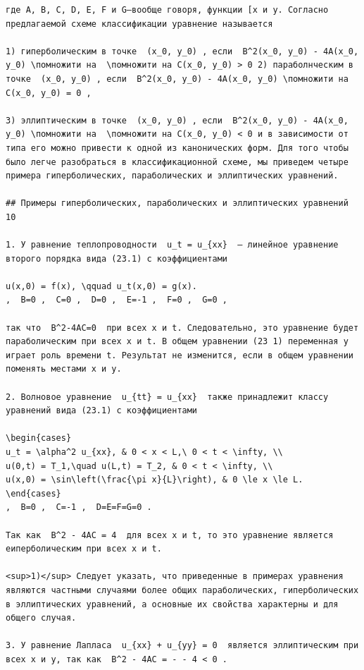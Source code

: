 \documentclass[
  ukrainian,
]{article}
\begin{document}
\begin{verbatim}
где A, B, C, D, E, F и G—вообще говоря, функции [x и y. Согласно предлагаемой схеме классификации уравнение называется

1) гиперболическим в точке  (x_0, y_0) , если  B^2(x_0, y_0) - 4A(x_0, y_0) \помножити на  \помножити на C(x_0, y_0) > 0 2) параболнческим в точке  (x_0, y_0) , если  B^2(x_0, y_0) - 4A(x_0, y_0) \помножити на C(x_0, y_0) = 0 ,

3) эллиптическим в точке  (x_0, y_0) , если  B^2(x_0, y_0) - 4A(x_0, y_0) \помножити на  \помножити на C(x_0, y_0) < 0 и в зависимости от типа его можно привести к одной из канонических форм. Для того чтобы было легче разобраться в классификационной схеме, мы приведем четыре примера гиперболических, параболических и эллиптических уравнений.

## Примеры гиперболических, параболических и эллиптических уравнений 10

1. У равнение теплопроводности  u_t = u_{xx}  — линейное уравнение второго порядка вида (23.1) с коэффициентами

u(x,0) = f(x), \qquad u_t(x,0) = g(x).
,  B=0 ,  C=0 ,  D=0 ,  E=-1 ,  F=0 ,  G=0 ,

так что  B^2-4AC=0  при всех x и t. Следовательно, это уравнение будет параболическим при всех x и t. В общем уравнении (23 1) переменная y играет роль времени t. Результат не изменится, если в общем уравнении поменять местами x и y.

2. Волновое уравнение  u_{tt} = u_{xx}  также принадлежит классу уравнений вида (23.1) с коэффициентами

\begin{cases}
u_t = \alpha^2 u_{xx}, & 0 < x < L,\ 0 < t < \infty, \\
u(0,t) = T_1,\quad u(L,t) = T_2, & 0 < t < \infty, \\
u(x,0) = \sin\left(\frac{\pi x}{L}\right), & 0 \le x \le L.
\end{cases}
,  B=0 ,  C=-1 ,  D=E=F=G=0 .

Так как  B^2 - 4AC = 4  для всех x и t, то это уравнение является еиперболическим при всех x и t.

<sup>1)</sup> Следует указать, что приведенные в примерах уравнения являются частными случаями более общих параболических, гиперболических в эллиптических уравнений, а основные их свойства характерны и для общего случая.

3. У равнение Лапласа  u_{xx} + u_{yy} = 0  является эллиптическим при всех x и y, так как  B^2 - 4AC = - - 4 < 0 .


\end{verbatim}
\end{document}
